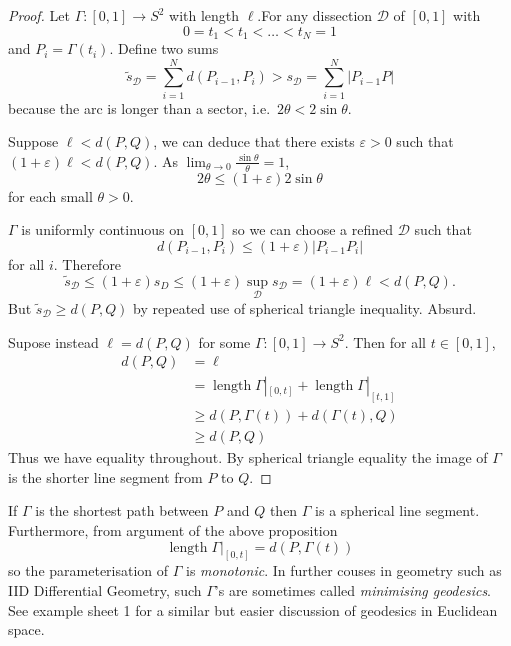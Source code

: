 \documentclass[a4paper]{article}
\begin{document}
\begin{proof}
  Let \(\Gamma: [0, 1] \to S^2\) with length \(\ell\).For any dissection \(\mathcal D\) of \([0, 1]\) with
  \[
    0 = t_1 < t_1 < \dots < t_N = 1
  \]
  and \(P_i = \Gamma(t_i)\). Define two sums
  \[
    \tilde s_{\mathcal D} = \sum_{i = 1}^N d(P_{i -1}, P_i) > s_{\mathcal D} = \sum_{i = 1}^N |P_{i - 1}P|
  \]
  because the arc is longer than a sector, i.e.\ \(2\theta < 2 \sin \theta\).

  Suppose \(\ell < d(P, Q)\), we can deduce that there exists \(\varepsilon > 0\) such that \((1 + \varepsilon)\ell < d(P, Q)\). As \(\lim_{\theta \to 0} \frac{\sin \theta}{\theta} = 1\),
  \[
    2\theta \leq (1 + \varepsilon) 2\sin \theta
  \]
  for each small \(\theta > 0\).

  \(\Gamma\) is uniformly continuous on \([0, 1]\) so we can choose a refined \(\mathcal D\) such that
  \[
    d(P_{i - 1}, P_i) \leq (1 + \varepsilon)|P_{i - 1}P_i|
  \]
  for all \(i\). Therefore
  \[
    \tilde s_{\mathcal D} \leq (1 + \varepsilon)s_D \leq (1 + \varepsilon)\sup_{\mathcal D} s_{\mathcal D} = (1 + \varepsilon) \ell < d(P, Q).
  \]
  But \(\tilde s_{\mathcal D} \geq d(P, Q)\) by repeated use of spherical triangle inequality. Absurd.

  Supose instead \(\ell = d(P, Q)\) for some \(\Gamma: [0, 1] \to S^2\). Then for all \(t \in [0, 1]\),
  \begin{align*}
    d(P, Q) &= \ell \\
            &= \operatorname{length} \Gamma|_{[0, t]} + \operatorname{length} \Gamma|_{[t, 1]} \\
            &\geq d(P, \Gamma(t)) + d(\Gamma(t), Q) \\
            &\geq d(P, Q) 
  \end{align*}
  Thus we have equality throughout. By spherical triangle equality the image of \(\Gamma\) is the shorter line segment from \(P\) to \(Q\).
\end{proof}

\begin{remark}
  If \(\Gamma\) is the shortest path between \(P\) and \(Q\) then \(\Gamma\) is a spherical line segment. Furthermore, from argument of the above proposition
  \[
    \operatorname{length} \Gamma|_{[0, t]} = d(P, \Gamma(t))
  \]
  so the parameterisation of \(\Gamma\) is \emph{monotonic}. In further couses in geometry such as IID Differential Geometry, such \(\Gamma\)'s are sometimes called \emph{minimising geodesics}. See example sheet 1 for a similar but easier discussion of geodesics in Euclidean space.
\end{remark}
\end{document}
